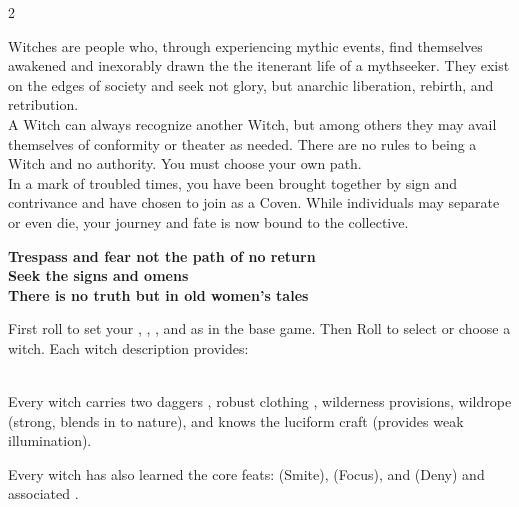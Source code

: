 \documentclass[10pt,letterpaper,portrait]{mythic-witches}
\begin{document}
\setlength{\columnsep}{3em} 
\begin{paracol}{2}

Witches are people who, through experiencing mythic events, find themselves awakened and inexorably drawn the the itenerant life of a mythseeker. They exist on the edges of society and seek not glory, but anarchic liberation, rebirth, and retribution.\\

A Witch can always recognize another Witch, but among others they may avail themselves of conformity or theater as needed. There are no rules to being a Witch and no authority. You must choose your own path.\\

In a mark of troubled times, you have been brought together by sign and contrivance and have chosen to join as a Coven. While individuals may separate or even die, your journey and fate is now bound to the collective.\\

\begin{center}
\bfseries{
Trespass and fear not the path of no return \\
Seek the signs and omens \\
There is no truth but in old women's tales
}
\end{center}

First roll to set your , , , and  as in the base game. Then Roll to select or choose a witch. Each witch description provides:\\
\\
\par\noindent
Every witch carries two daggers , robust clothing , wilderness provisions, wildrope (strong, blends in to nature), and knows the luciform craft (provides weak illumination).
\\
\par\noindent
Every witch has also learned the core feats:  {\small(Smite)},  {\small(Focus)}, and  {\small(Deny)} and associated .

\switchcolumn


\end{paracol}
\end{document}
